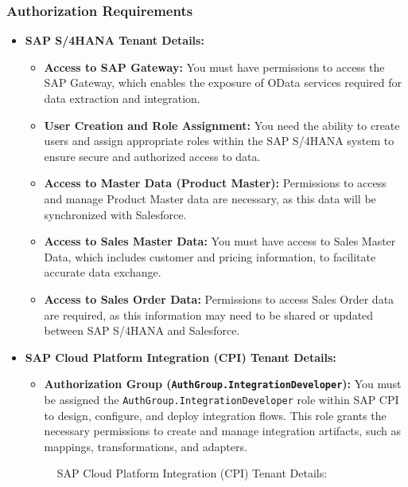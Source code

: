 \subsubsection{Authorization Requirements}
\begin{itemize}
    \item \textbf{SAP S/4HANA Tenant Details:}
    \begin{itemize}
        \item \textbf{Access to SAP Gateway:} You must have permissions to access the SAP Gateway, which enables the exposure of OData services required for data extraction and integration.
        \item \textbf{User Creation and Role Assignment:} You need the ability to create users and assign appropriate roles within the SAP S/4HANA system to ensure secure and authorized access to data.
        \item \textbf{Access to Master Data (Product Master):} Permissions to access and manage Product Master data are necessary, as this data will be synchronized with Salesforce.
        \item \textbf{Access to Sales Master Data:} You must have access to Sales Master Data, which includes customer and pricing information, to facilitate accurate data exchange.
        \item \textbf{Access to Sales Order Data:} Permissions to access Sales Order data are required, as this information may need to be shared or updated between SAP S/4HANA and Salesforce.
    \end{itemize}

    

    \item \textbf{SAP Cloud Platform Integration (CPI) Tenant Details:}
    \begin{itemize}
        \item \textbf{Authorization Group (\texttt{AuthGroup.IntegrationDeveloper}):} You must be assigned the \texttt{AuthGroup.IntegrationDeveloper} role within SAP CPI to design, configure, and deploy integration flows. This role grants the necessary permissions to create and manage integration artifacts, such as mappings, transformations, and adapters.
    \end{itemize}

    \begin{figure}[H]
    \centering
    \caption{SAP Cloud Platform Integration (CPI) Tenant Details:}
    

\end{figure}
\end{itemize}
